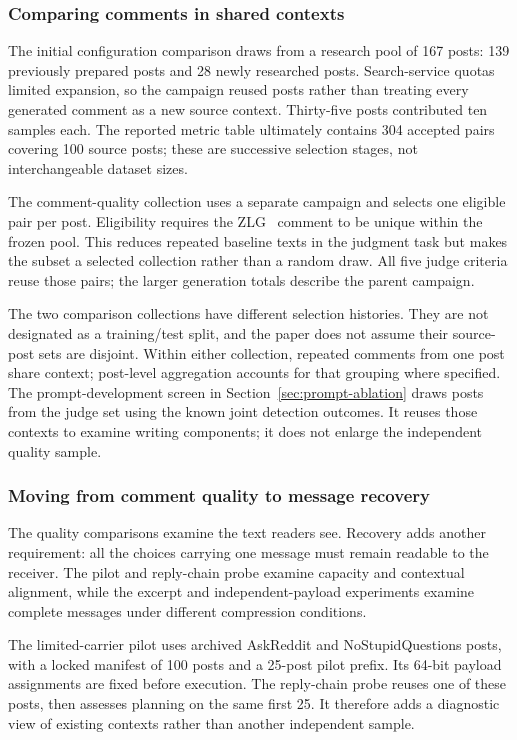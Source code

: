\subsubsection{Comparing comments in shared contexts}
The initial configuration comparison draws from a research pool of 167 posts: 139 previously prepared posts and 28 newly researched posts. Search-service quotas limited expansion, so the campaign reused posts rather than treating every generated comment as a new source context. Thirty-five posts contributed ten samples each. The reported metric table ultimately contains 304 accepted pairs covering 100 source posts; these are successive selection stages, not interchangeable dataset sizes.

The comment-quality collection uses a separate campaign and selects one eligible pair per post. Eligibility requires the ZLG~\cite{lin2024zero} comment to be unique within the frozen pool. This reduces repeated baseline texts in the judgment task but makes the subset a selected collection rather than a random draw. All five judge criteria reuse those pairs; the larger generation totals describe the parent campaign.

The two comparison collections have different selection histories. They are not designated as a training/test split, and the paper does not assume their source-post sets are disjoint. Within either collection, repeated comments from one post share context; post-level aggregation accounts for that grouping where specified. The prompt-development screen in Section~\ref{sec:prompt-ablation} draws \DsPromptPosts{} posts from the judge set using the known joint detection outcomes. It reuses those contexts to examine writing components; it does not enlarge the independent quality sample.

\subsubsection{Moving from comment quality to message recovery}
The quality comparisons examine the text readers see. Recovery adds another requirement: all the choices carrying one message must remain readable to the receiver. The pilot and reply-chain probe examine capacity and contextual alignment, while the excerpt and independent-payload experiments examine complete messages under different compression conditions.

The limited-carrier pilot uses archived AskReddit and NoStupidQuestions posts, with a locked manifest of 100 posts and a 25-post pilot prefix. Its 64-bit payload assignments are fixed before execution. The reply-chain probe reuses one of these posts, then assesses planning on the same first 25. It therefore adds a diagnostic view of existing contexts rather than another independent sample.

